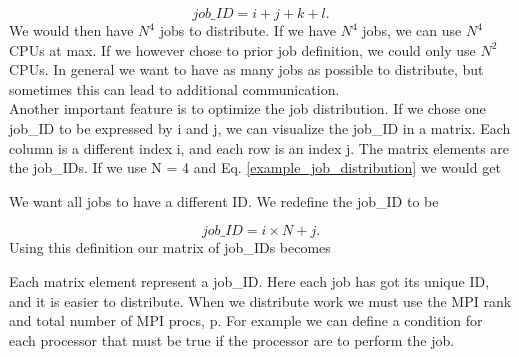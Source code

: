 \begin{equation}
job\_ID = i + j + k + l .
\end{equation}
We would then have $N^4$ jobs to distribute. If we have $N^4$ jobs, we can  use $N^4$ CPUs at max. If we however chose to prior job definition, we could only use $N^2$ CPUs. In general we want to have as many jobs as possible to distribute, but sometimes this can lead to additional communication. \\

Another important feature is to optimize the job distribution. If we chose one job\_ID to be expressed by i and j, we can visualize the job\_ID in a matrix. Each column is a different index i, and each row is an index j. The matrix elements are the job\_IDs. If we use N = 4 and Eq. \eqref{example_job_distribution} we would get

\begin{center}
\end{center}
We want all jobs to have a different ID. We redefine the job\_ID to be

\begin{equation}
job\_ID = i \times N + j .
\end{equation}
Using this definition our matrix of job\_IDs becomes

\begin{center}
\end{center}
Each matrix element represent a job\_ID. Here each job has got its unique ID, and it is easier to distribute. When we distribute work we must use the MPI rank and total number of MPI procs, p. For example we can define a condition for each processor that must be true if the processor are to perform the job.

